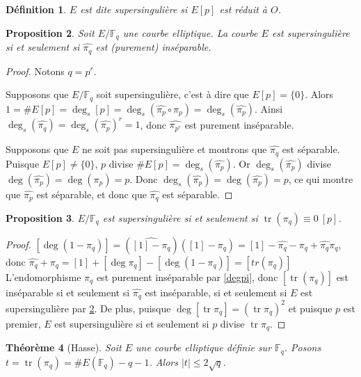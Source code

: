 \documentclass{article}
\theoremstyle{plain}%
\newtheorem{thm}{Théorème}[section]
\newtheorem{prop}[thm]{Proposition}
\newtheorem{deff}[thm]{Définition}
\theoremstyle{definition}%
\newcommand{\F}{\mathbb{F}}
\newcommand{\h}{\widehat}
\DeclareMathOperator{\tr}{tr}
\begin{document}
\begin{deff}
  $E$ est dite supersingulière si $E[p]$ est réduit à $O$. 
\end{deff}

\begin{prop}
  \label{pihatsep}
  Soit $E/\F_q$ une courbe elliptique. La courbe $E$ est supersingulière si et seulement si $\widehat{\pi_q}$ est (purement) inséparable.
\end{prop}

\begin{proof}
  Notons $q = p^r$. 

  Supposons que $E/\F_q$ soit supersingulière, c'est à dire que $E[p] = \{0\}$. Alors $1 = \#E[p] = \deg_s[p] = \deg_s(\h{\pi_{p}} \circ \pi_{p}) = \deg_s(\h{\pi_{p}})$. Ainsi $\deg_s(\h{\pi_{q}}) =  \deg_s(\h{\pi_{p}})^r= 1$, donc $\h{\pi_{p^r}}$ est purement inséparable.

  Supposons que $E$ ne soit pas supersingulière et montrons que $\h{\pi_{q}}$ est séparable. Puisque $E[p] \neq \{0\}$, $p$ divise $\#E[p] = \deg_s(\h{\pi_p})$. Or $\deg_s(\h{\pi_p})$ divise $\deg(\h{\pi_p}) = \deg({\pi_p}) = p$. Donc $\deg_s(\h{\pi_p}) = \deg(\h{\pi_p}) =p$, ce qui montre que $\h{\pi_p}$ est séparable, et donc que $\h{\pi_q}$ est séparable.
\end{proof}

\begin{prop}
  \label{pimodp}
  $E/\F_q$ est supersingulière si et seulement si $\tr(\pi_q) \equiv 0\ [p]$. 
\end{prop}

\begin{proof}
  $[\deg(1-\pi_q)] = (\widehat{[1] - \pi_q})([1]-\pi_q) = [1] - \widehat{\pi_q} - \pi_q + \widehat{\pi_q}\pi_q  $, donc $ \widehat{\pi_q} + \pi_q = [1] + [\deg\pi_q] - [\deg(1-\pi_q)] = [tr(\pi_q)]  $ 
  L'endomorphisme $\pi_q$ est purement inséparable par \ref{degpi}, donc $[\tr(\pi_q)]$ est inséparable si et seulement si $\widehat{\pi_q}$ est inséparable, si et seulement si $E$ est supersingulière par \ref{pihatsep}. De plus, puisque $\deg[\tr \pi_q] =(\tr \pi_q)^2$ et puisque $p$ est premier, $E$ est supersingulière si et seulement si $p$ divise $\tr\pi_q$. 
\end{proof}


\begin{thm}[Hasse]
  \label{hasse}
  Soit $E$ une courbe elliptique définie sur $\F_q$. Posons $t = \tr(\pi_q) = \# E(\F_q) - q -1$. Alors $|t| \le 2\sqrt{q}$.
\end{thm}
\end{document}
